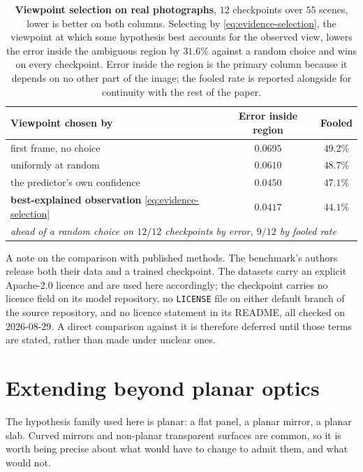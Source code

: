 \begin{table}[!ht]
\caption{\textbf{Viewpoint selection on real photographs}, $12$ checkpoints over
$55$ scenes, lower is better on both columns. Selecting by
\eqref{eq:evidence-selection}, the viewpoint at which some hypothesis best accounts
for the observed view, lowers the error inside the ambiguous region by $31.6\%$
against a random choice and wins on every checkpoint. Error inside the region is
the primary column because it depends on no other part of the image; the fooled
rate is reported alongside for continuity with the rest of the paper.}
\label{tab:supp-viewpoint}
\begin{center}
\footnotesize
\begin{tabular}{lcc}
\toprule
\textbf{Viewpoint chosen by} & \textbf{Error inside region} & \textbf{Fooled} \\
\midrule
first frame, no choice          & $0.0695$ & $49.2\%$ \\
uniformly at random             & $0.0610$ & $48.7\%$ \\
the predictor's own confidence  & $0.0450$ & $47.1\%$ \\
\textbf{best-explained observation} \eqref{eq:evidence-selection} & $\mathbf{0.0417}$ & $\mathbf{44.1\%}$ \\
\midrule
\multicolumn{3}{l}{\emph{ahead of a random choice on $12/12$ checkpoints by error, $9/12$ by fooled rate}} \\
\bottomrule
\end{tabular}
\end{center}
\end{table}

A note on the comparison with published methods. The benchmark's authors release
both their data and a trained checkpoint. The datasets carry an explicit
Apache-2.0 licence and are used here accordingly; the checkpoint carries no licence
field on its model repository, no \texttt{LICENSE} file on either default branch of
the source repository, and no licence statement in its README, all checked on
2026-08-29. A direct comparison against it is therefore deferred until those terms
are stated, rather than made under unclear ones.

\section{Extending beyond planar optics}
\label{sec:supp-extension}

The hypothesis family used here is planar: a flat panel, a planar mirror, a planar
slab. Curved mirrors and non-planar transparent surfaces are common, so it is worth
being precise about what would have to change to admit them, and what would not.

